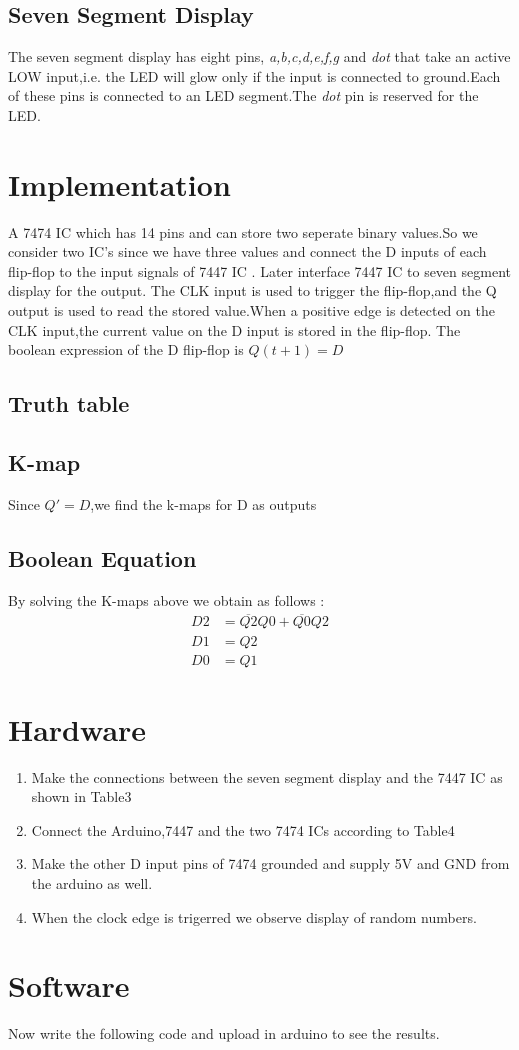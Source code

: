 \documentclass[10pt,a4paper]{article}
\begin{document}
\subsection{Seven Segment Display}
The seven segment display has eight pins, \emph{a,b,c,d,e,f,g} and \emph{dot} that take an active LOW input,i.e. the LED will glow only if the input is connected to ground.Each of these pins is connected to an LED segment.The \emph{dot} pin is reserved for the LED.
\section{Implementation}
A 7474 IC which  has 14 pins and can store two seperate binary values.So we consider two IC's since we have three values  and connect the  D inputs of each flip-flop to the input signals of 7447 IC . Later interface 7447 IC to seven segment display for the output. The CLK input is used to trigger the flip-flop,and the Q output is used to read the stored value.When a positive edge is detected on the CLK input,the current value on the D input is stored in the flip-flop. The boolean expression of the D flip-flop is $Q(t+1) = D$
\subsection{Truth table}
     
	  \subsection{K-map}
Since $Q'= D$,we find the k-maps for D as outputs\\



\subsection{Boolean Equation}
By solving the K-maps above we obtain as follows :
\begin{align}
	D2 &= \overline{Q2}Q0 + \overline{Q0}Q2 \\
	D1 &= Q2 \\
	D0 &= Q1 
\end{align}
\section{Hardware}
\begin{enumerate}
\item Make the connections between the seven segment display and the 7447 IC as shown in Table3
	                          
\item Connect the Arduino,7447 and the two 7474 ICs according to Table4
	                                                                       \item Make the other D input pins of 7474 grounded and supply  5V and GND from the arduino as well.
\item When the clock edge is trigerred we observe display of random numbers.
\end{enumerate}
\section{Software}
Now write the following code and upload in arduino to see the results.

\end{document}
